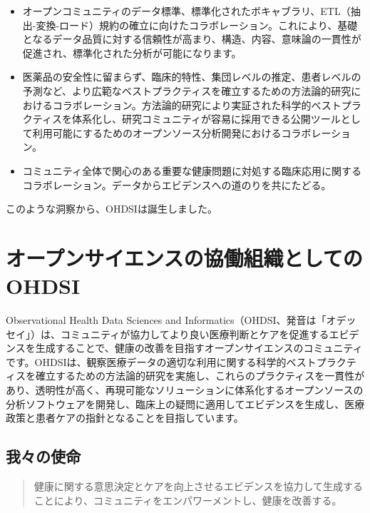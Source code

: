 \documentclass[
  11pt]{book}
\providecommand{\tightlist}{%
  \setlength{\itemsep}{0pt}\setlength{\parskip}{0pt}}
\theoremstyle{definition}
\theoremstyle{definition}
\theoremstyle{definition}
\theoremstyle{definition}
\theoremstyle{remark}
\begin{document}
\begin{itemize}
\tightlist
\item
  オープンコミュニティのデータ標準、標準化されたボキャブラリ、ETL（抽出-変換-ロード）規約の確立に向けたコラボレーション。これにより、基礎となるデータ品質に対する信頼性が高まり、構造、内容、意味論の一貫性が促進され、標準化された分析が可能になります。
\item
  医薬品の安全性に留まらず、臨床的特性、集団レベルの推定、患者レベルの予測など、より広範なベストプラクティスを確立するための方法論的研究におけるコラボレーション。方法論的研究により実証された科学的ベストプラクティスを体系化し、研究コミュニティが容易に採用できる公開ツールとして利用可能にするためのオープンソース分析開発におけるコラボレーション。
\item
  コミュニティ全体で関心のある重要な健康問題に対処する臨床応用に関するコラボレーション。データからエビデンスへの道のりを共にたどる。
\end{itemize}

このような洞察から、OHDSIは誕生しました。

\section{オープンサイエンスの協働組織としてのOHDSI}\label{ux30aaux30fcux30d7ux30f3ux30b5ux30a4ux30a8ux30f3ux30b9ux306eux5354ux50cdux7d44ux7e54ux3068ux3057ux3066ux306eohdsi}

Observational Health Data Sciences and Informatics（OHDSI、発音は「オデッセイ」）は、コミュニティが協力してより良い医療判断とケアを促進するエビデンスを生成することで、健康の改善を目指すオープンサイエンスのコミュニティです\citep{Hripcsak2015}。OHDSIは、観察医療データの適切な利用に関する科学的ベストプラクティスを確立するための方法論的研究を実施し、これらのプラクティスを一貫性があり、透明性が高く、再現可能なソリューションに体系化するオープンソースの分析ソフトウェアを開発し、臨床上の疑問に適用してエビデンスを生成し、医療政策と患者ケアの指針となることを目指しています。

\subsection{我々の使命}\label{ux6211ux3005ux306eux4f7fux547d}

\begin{quote}
健康に関する意思決定とケアを向上させるエビデンスを協力して生成することにより、コミュニティをエンパワーメントし、健康を改善する。 
\end{quote}
\end{document}
